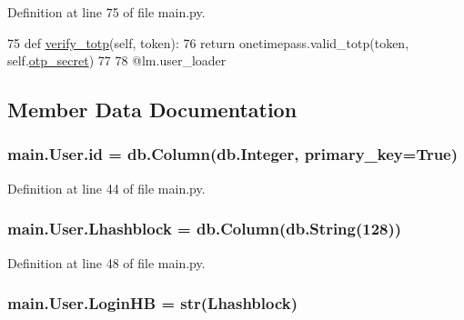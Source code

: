 Definition at line 75 of file main.\+py.


\begin{DoxyCode}
75     \textcolor{keyword}{def }\hyperlink{classmain_1_1User_a390f1500b4c2fe34d0ba3cf8d1d54906}{verify\_totp}(self, token):
76         \textcolor{keywordflow}{return} onetimepass.valid\_totp(token, self.\hyperlink{classmain_1_1User_a2a7a2d67099632b248ad93661e9733d2}{otp\_secret})
77 
78 @lm.user\_loader
\end{DoxyCode}


\subsection{Member Data Documentation}
\subsubsection[{\texorpdfstring{id}{id}}]{\setlength{\rightskip}{0pt plus 5cm}main.\+User.\+id = db.\+Column(db.\+Integer, primary\+\_\+key=True)\hspace{0.3cm}{\ttfamily [static]}}\hypertarget{classmain_1_1User_af213bc1240b634425b1b571d6bccc561}{}\label{classmain_1_1User_af213bc1240b634425b1b571d6bccc561}


Definition at line 44 of file main.\+py.

\subsubsection[{\texorpdfstring{Lhashblock}{Lhashblock}}]{\setlength{\rightskip}{0pt plus 5cm}main.\+User.\+Lhashblock = db.\+Column(db.\+String(128))\hspace{0.3cm}{\ttfamily [static]}}\hypertarget{classmain_1_1User_aa3b839482f4a293703c22ae82e9c639d}{}\label{classmain_1_1User_aa3b839482f4a293703c22ae82e9c639d}


Definition at line 48 of file main.\+py.

\subsubsection[{\texorpdfstring{Login\+HB}{LoginHB}}]{\setlength{\rightskip}{0pt plus 5cm}main.\+User.\+Login\+HB = str({\bf Lhashblock})\hspace{0.3cm}{\ttfamily [static]}}\hypertarget{classmain_1_1User_aece6256cb85b54493c6d05185f112716}{}\label{classmain_1_1User_aece6256cb85b54493c6d05185f112716}


